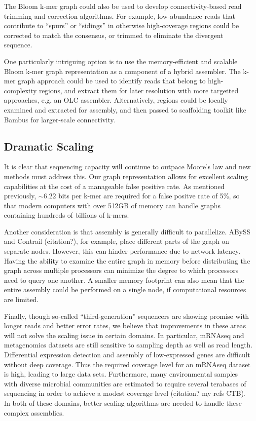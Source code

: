 \documentclass[12pt]{article} \usepackage{simplemargins}
\begin{document}
The Bloom k-mer graph could also be used to develop connectivity-based
read trimming and correction algorithms.  For example, low-abundance
reads that contribute to ``spurs'' or ``sidings'' in otherwise
high-coverage regions could be corrected to match the
consensus, or trimmed to eliminate the divergent sequence.

One particularly intriguing option is to use the memory-efficient and
scalable Bloom k-mer graph representation as a component of a hybrid
assembler.  The k-mer graph approach could be used to identify
reads that belong to high-complexity regions, and extract them for
later resolution with more targetted approaches, e.g. an OLC assembler.
Alternatively, regions could be locally examined and extracted for
assembly, and then passed to scaffolding toolkit like Bambus for 
larger-scale connectivity\cite{bambus}.

\subsection{Dramatic Scaling}
It is clear that sequencing capacity will continue to outpace Moore's 
law and new methods must address this. Our graph representation allows 
for excellent scaling capabilities at the cost of a manageable false positive rate. 
As mentioned previously, $\sim 6.22$ bits per k-mer are required for a 
false positve rate of 5\%, so that modern computers with 
over 512GB of memory can handle graphs containing hundreds of billions of k-mers.

Another consideration is that assembly is generally difficult to parallelize. 
ABySS and Contrail (citation?), for example, place different parts of the 
graph on separate nodes. However, this can hinder performance due to 
network latency. Having the ability to examine the entire graph in memory 
before distributing the graph across multiple processors can minimize the
degree to which processors need to query one another. A smaller memory 
footprint can also mean that the entire assembly could be performed on 
a single node, if computational resources are limited.

Finally, though so-called ``third-generation'' sequencers are showing promise with 
longer reads and better error rates, we believe that improvements in these 
areas will not solve the scaling issue in certain domains. In particular, 
mRNAseq and metagenomics datasets are still sensitive to sampling depth as
well as read length. Differential expression detection and assembly 
of low-expressed genes are difficult without deep coverage. Thus
the required coverage level for an mRNAseq dataset is high, leading to large
data sets. Furthermore, many environmental samples with 
diverse microbial communities are estimated to require several terabases of sequencing 
in order to achieve a modest coverage level (citation?  my refs CTB). In both of these domains, better 
scaling algorithms are needed to handle these complex assemblies. 
\end{document}
